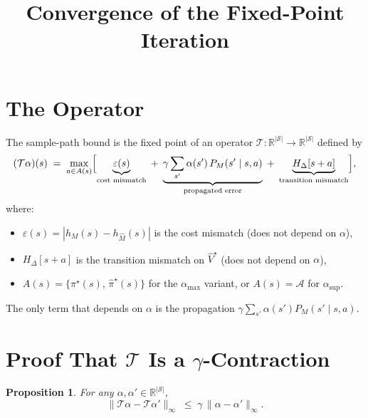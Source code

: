 \documentclass[11pt]{article}
\title{Convergence of the Fixed-Point Iteration}
\date{}
\newcommand{\pistar}{\pi^\star}
\newcommand{\pihatstar}{\hat\pi^\star}
\newcommand{\Vhatstar}{\hat V^\star}
\newtheorem{proposition}{Proposition}
\begin{document}
\maketitle

\section{The Operator}

The sample-path bound is the fixed point of an operator
$\mathcal{T}\colon \mathbb{R}^{|\mathcal{S}|} \to \mathbb{R}^{|\mathcal{S}|}$
defined by
\begin{equation}\label{eq:operator}
  (\mathcal{T}\alpha)(s)
  \;=\; \max_{a \in A(s)}
  \Bigl[
    \underbrace{\varepsilon(s)}_{\text{cost mismatch}}
    \;+\; \underbrace{\gamma \sum_{s'} \alpha(s')\, P_M(s' \mid s, a)}_{\text{propagated error}}
    \;+\; \underbrace{H_\Delta[s+a]}_{\text{transition mismatch}}
  \Bigr],
\end{equation}
where:
\begin{itemize}
  \item $\varepsilon(s) = |h_M(s) - h_{\hat M}(s)|$ is the cost mismatch (does not depend on $\alpha$),
  \item $H_\Delta[s+a]$ is the transition mismatch on $\Vhatstar$ (does not depend on $\alpha$),
  \item $A(s) = \{\pistar(s),\, \pihatstar(s)\}$ for the $\alpha_{\max}$ variant,
        or $A(s) = \mathcal{A}$ for $\alpha_{\sup}$.
\end{itemize}

The only term that depends on $\alpha$ is the propagation
$\gamma \sum_{s'} \alpha(s') P_M(s' \mid s, a)$.

\section{Proof That $\mathcal{T}$ Is a $\gamma$-Contraction}

\begin{proposition}
For any $\alpha, \alpha' \in \mathbb{R}^{|\mathcal{S}|}$,
\[
  \|\mathcal{T}\alpha - \mathcal{T}\alpha'\|_\infty
  \;\le\; \gamma\, \|\alpha - \alpha'\|_\infty.
\]
\end{proposition}
\end{document}
